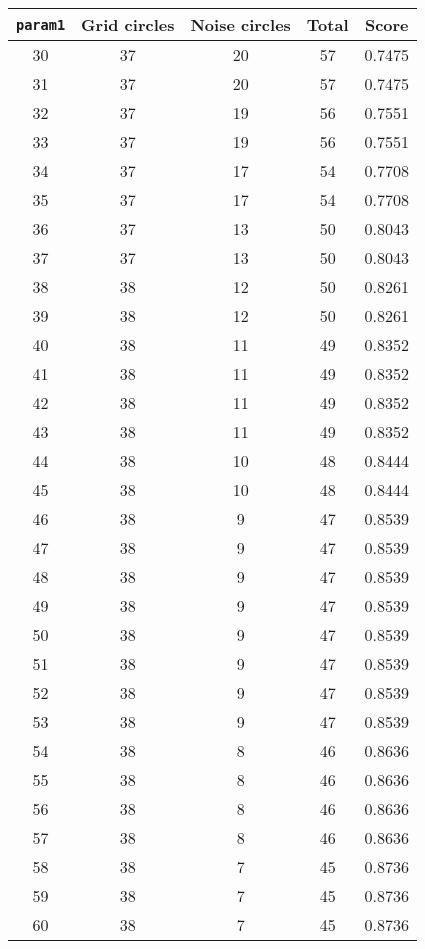 \documentclass[letterpaper, 12pt]{article}
\begin{document}
\begin{longtable}{|c|c|c|c|c|}
\hline
\textbf{\texttt{param1}} & \textbf{Grid circles} & \textbf{Noise circles} & \textbf{Total} & \textbf{Score} \\
\hline
30 & 37 & 20 & 57 & 0.7475 \\
\hline
31 & 37 & 20 & 57 & 0.7475 \\
\hline
32 & 37 & 19 & 56 & 0.7551 \\
\hline
33 & 37 & 19 & 56 & 0.7551 \\
\hline
34 & 37 & 17 & 54 & 0.7708 \\
\hline
35 & 37 & 17 & 54 & 0.7708 \\
\hline
36 & 37 & 13 & 50 & 0.8043 \\
\hline
37 & 37 & 13 & 50 & 0.8043 \\
\hline
38 & 38 & 12 & 50 & 0.8261 \\
\hline
39 & 38 & 12 & 50 & 0.8261 \\
\hline
40 & 38 & 11 & 49 & 0.8352 \\
\hline
41 & 38 & 11 & 49 & 0.8352 \\
\hline
42 & 38 & 11 & 49 & 0.8352 \\
\hline
43 & 38 & 11 & 49 & 0.8352 \\
\hline
44 & 38 & 10 & 48 & 0.8444 \\
\hline
45 & 38 & 10 & 48 & 0.8444 \\
\hline
46 & 38 & 9 & 47 & 0.8539 \\
\hline
47 & 38 & 9 & 47 & 0.8539 \\
\hline
48 & 38 & 9 & 47 & 0.8539 \\
\hline
49 & 38 & 9 & 47 & 0.8539 \\
\hline
50 & 38 & 9 & 47 & 0.8539 \\
\hline
51 & 38 & 9 & 47 & 0.8539 \\
\hline
52 & 38 & 9 & 47 & 0.8539 \\
\hline
53 & 38 & 9 & 47 & 0.8539 \\
\hline
54 & 38 & 8 & 46 & 0.8636 \\
\hline
55 & 38 & 8 & 46 & 0.8636 \\
\hline
56 & 38 & 8 & 46 & 0.8636 \\
\hline
57 & 38 & 8 & 46 & 0.8636 \\
\hline
58 & 38 & 7 & 45 & 0.8736 \\
\hline
59 & 38 & 7 & 45 & 0.8736 \\
\hline
60 & 38 & 7 & 45 & 0.8736 \\

\end{longtable}
\end{document}
